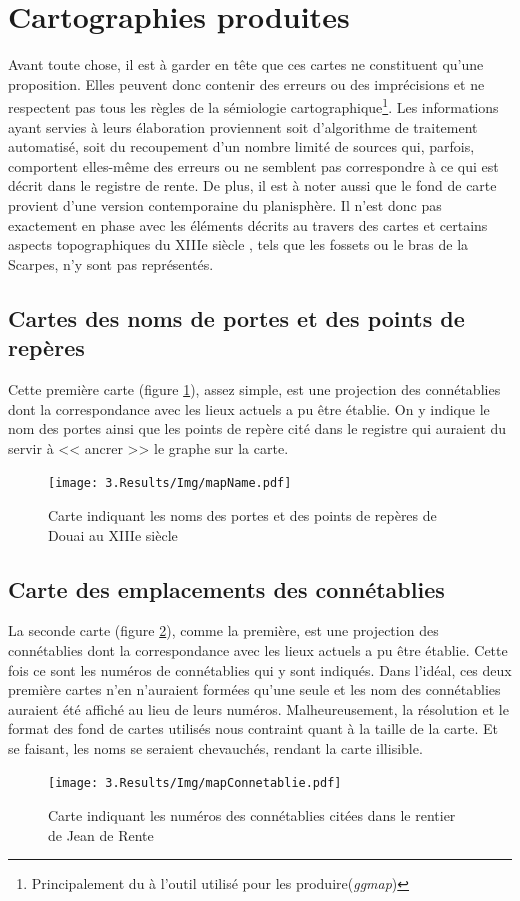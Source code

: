 \section{Cartographies produites}
Avant toute chose, il est à garder en tête que ces cartes  ne constituent qu'une proposition. Elles peuvent donc contenir des erreurs ou des imprécisions et ne respectent pas tous les règles de la sémiologie cartographique\footnote{Principalement du  à l'outil utilisé pour les produire(\textit{ggmap})}. Les informations ayant servies à leurs élaboration proviennent soit d'algorithme de traitement automatisé, soit du recoupement d'un nombre limité de sources qui, parfois, comportent elles-même des erreurs ou ne semblent pas correspondre à ce qui est décrit dans le registre de rente.
De plus,  il est à noter aussi que le fond de carte provient d'une version contemporaine du planisphère. Il n'est donc pas exactement en phase avec les éléments décrits au travers des cartes et certains aspects topographiques du XIIIe siècle , tels que les fossets ou le bras de la Scarpes,  n'y sont pas représentés.

\subsection{Cartes des noms de portes et des points de repères}
Cette première carte (figure \ref{fig:mapName}), assez simple, est une projection des connétablies dont la correspondance avec les lieux actuels a pu être établie. On y indique le nom des portes ainsi que les points de repère cité dans le registre qui auraient du servir à << ancrer >> le graphe sur la carte.
\begin{figure}
    \centering
    \texttt{[image: 3.Results/Img/mapName.pdf]}
    \caption{Carte indiquant les noms des portes et des points de repères de Douai au XIIIe siècle}
    \label{fig:mapName}
\end{figure}
\subsection{Carte des emplacements des connétablies}
La seconde carte (figure \ref{fig:mapConnetablie}), comme la première,  est une projection des connétablies dont la correspondance avec les lieux actuels a pu être établie. Cette fois  ce sont les numéros de connétablies qui y sont indiqués. Dans l'idéal, ces deux première cartes n'en n'auraient formées qu'une seule et les nom des connétablies auraient été affiché au lieu de leurs numéros. Malheureusement, la résolution et le format des fond de cartes utilisés nous contraint quant à la taille de la carte. Et se faisant, les noms se seraient chevauchés, rendant la carte illisible.
\begin{figure}
    \centering
    \texttt{[image: 3.Results/Img/mapConnetablie.pdf]}
    \caption{Carte indiquant les numéros des connétablies citées dans le rentier de Jean de Rente}
    \label{fig:mapConnetablie}
\end{figure}

